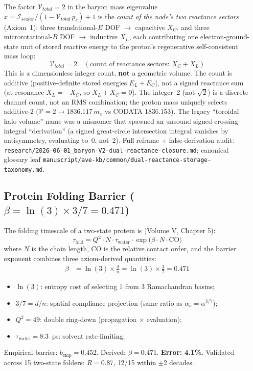 The factor $\mathcal{V}_{total} = 2$ in the baryon mass eigenvalue
$x = \mathcal{I}_{scalar}/(1 - \mathcal{V}_{total}\, p_c) + 1$ is the
\emph{count of the node's two reactance sectors} (Axiom~1): three
translational-$E$ DOF $\to$ capacitive $X_C$, and three microrotational-$B$
DOF $\to$ inductive $X_L$, each contributing one electron-ground-state unit of
stored reactive energy to the proton's regenerative self-consistent mass loop:
\begin{equation}
    \mathcal{V}_{total} = 2 \quad
    (\text{count of reactance sectors: } X_C + X_L)
\end{equation}
This is a dimensionless integer count, \textbf{not} a geometric volume. The
count is additive (positive-definite stored energies $E_L + E_C$), not a signed
reactance sum (at resonance $X_L = -X_C$, so $X_L + X_C = 0$). The integer~2
(not $\sqrt{2}$) is a discrete channel count, not an RMS combination; the proton
mass uniquely selects additive-2 ($\mathcal{V} = 2 \to 1836.117\,m_e$ vs CODATA
$1836.153$). The legacy ``toroidal halo volume'' name was a misnomer that
spawned an unsound signed-crossing-integral ``derivation'' (a signed
great-circle intersection integral vanishes by antisymmetry, evaluating to~0,
not~2). Full reframe + false-derivation audit:
\texttt{research/2026-06-01\_baryon-V2-dual-reactance-closure.md};
canonical glossary leaf
\texttt{manuscript/ave-kb/common/dual-reactance-storage-taxonomy.md}.

\subsection{Protein Folding Barrier ($\beta = \ln(3) \times 3/7 = 0.471$)}

The folding timescale of a two-state protein is (Volume V, Chapter 5):
\begin{equation}
    \tau_\text{fold} = Q^2 \cdot N \cdot \tau_\text{water} \cdot \exp\!\bigl(\beta \cdot N \cdot \text{CO}\bigr)
\end{equation}
where $N$ is the chain length, CO is the relative contact order, and the barrier exponent combines three axiom-derived quantities:
\begin{align}
    \beta &= \ln(3) \times \frac{d}{n} = \ln(3) \times \frac{3}{7} = 0.471
\end{align}
\begin{itemize}
    \item $\ln(3)$: entropy cost of selecting 1 from 3 Ramachandran basins;
    \item $3/7 = d/n$: spatial compliance projection (same ratio as $\alpha_s = \alpha^{3/7}$);
    \item $Q^2 = 49$: double ring-down (propagation $\times$ evaluation);
    \item $\tau_\text{water} = 8.3$~ps: solvent rate-limiting.
\end{itemize}
Empirical barrier: $b_\text{emp} = 0.452$.  Derived: $\beta = 0.471$.  \textbf{Error: 4.1\%.}
Validated across 15 two-state folders: $R = 0.87$, 12/15 within $\pm$2 decades.

